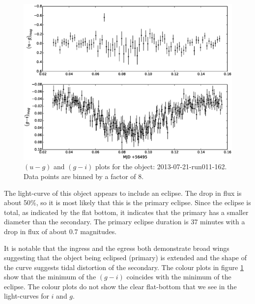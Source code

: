 \begin{figure}
  \center
  \includegraphics[width=120mm]{images/2013-07-21-run011-162_colourcurve-bin8.eps}
  \caption{$(u - g)$ and $(g - i)$ plots for the object: 2013-07-21-run011-162. Data points are binned by a factor of 8.}
  \label{fig:2013-07-21-run011-162-colour}
\end{figure} 

The light-curve of this object appears to include an eclipse.  The drop in flux is about 50\%, so it is most likely that this is the primary eclipse. Since the eclipse is total, as indicated by the flat bottom, it indicates that the primary has a smaller diameter than the secondary. The primary eclipse duration is 37 minutes with a drop in flux of about 0.7 magnitudes. 

It is notable that the ingress and the egress both demonstrate broad wings suggesting that the object being eclipsed (primary) is extended and the shape of the curve suggests tidal distortion of the secondary. The colour plots in figure \ref{fig:2013-07-21-run011-162-colour} show that the minimum of the $(g-i)$ coincides with the minimum of the eclipse. The colour plots do not show the clear flat-bottom that we see in the light-curves for $i$ and $g$. 

